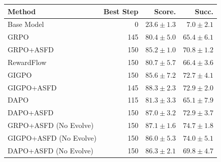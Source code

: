 \begin{tabular}{lrrr}
\toprule
Method & Best Step & Score. & Succ. \\
\midrule
Base Model & 0 & $23.6 \pm 1.3$ & $7.0 \pm 2.1$ \\
GRPO & 145 & $80.4 \pm 5.0$ & $65.4 \pm 6.1$ \\
GRPO+ASFD & 150 & $85.2 \pm 1.0$ & $70.8 \pm 1.2$ \\
RewardFlow & 150 & $80.7 \pm 5.7$ & $66.4 \pm 3.6$ \\
GIGPO & 150 & $85.6 \pm 7.2$ & $72.7 \pm 4.1$ \\
GIGPO+ASFD & 145 & $88.3 \pm 2.3$ & $72.9 \pm 2.0$ \\
DAPO & 115 & $81.3 \pm 3.3$ & $65.1 \pm 7.9$ \\
DAPO+ASFD & 150 & $87.0 \pm 3.2$ & $72.9 \pm 3.7$ \\
GRPO+ASFD (No Evolve) & 150 & $87.1 \pm 1.6$ & $74.7 \pm 1.8$ \\
GIGPO+ASFD (No Evolve) & 150 & $86.0 \pm 5.3$ & $74.0 \pm 5.1$ \\
DAPO+ASFD (No Evolve) & 150 & $86.3 \pm 2.1$ & $69.8 \pm 4.7$ \\
\bottomrule
\end{tabular}
